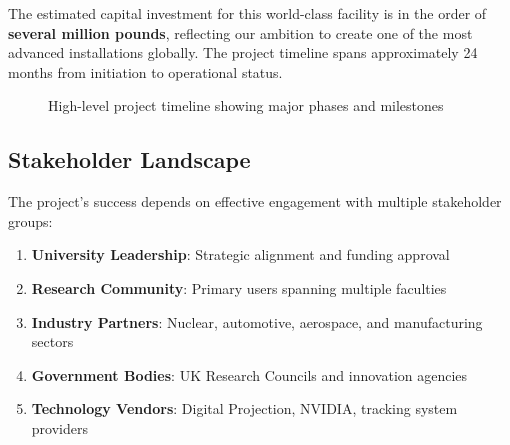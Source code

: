 The estimated capital investment for this world-class facility is in the order of \textbf{several million pounds}, reflecting our ambition to create one of the most advanced installations globally. The project timeline spans approximately 24 months from initiation to operational status.

\begin{figure}[h]
\centering
{}
\caption{High-level project timeline showing major phases and milestones}
\end{figure}

\subsection{Stakeholder Landscape}

The project's success depends on effective engagement with multiple stakeholder groups:

\begin{enumerate}
    \item \textbf{University Leadership}: Strategic alignment and funding approval
    \item \textbf{Research Community}: Primary users spanning multiple faculties
    \item \textbf{Industry Partners}: Nuclear, automotive, aerospace, and manufacturing sectors
    \item \textbf{Government Bodies}: UK Research Councils and innovation agencies
    \item \textbf{Technology Vendors}: Digital Projection, NVIDIA, tracking system providers
\end{enumerate}

